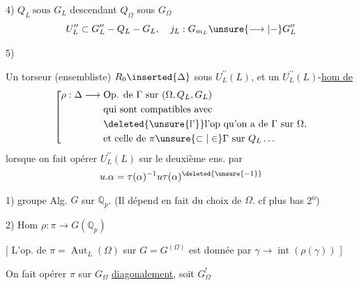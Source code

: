 4) \(\boxed{Q_L\ \text{sous }G_L}\) descendant $Q_\Omega$ sous $G_\Omega$
\[
U_L^{\prime\prime}\subset G_L^{\prime\prime}\mathbin{-}Q_L\mathbin{-}G_L,\quad
j_L:G_{m_L}\unsure{\longrightarrow|\mathbin{-}}G_L^{\prime\prime}
\]

5) 

Un torseur (ensembliste)  $R_0\inserted{\Delta}$ sous $U_L^{\prime\prime}(L)$, et un $U_L^{\prime\prime}(L)$-\uline{hom de}
\[
\left[\begin{aligned}
\rho:\Delta\longrightarrow{}&\text{Op. de }\Gamma\text{ sur }(\Omega,Q_L,G_L)\\
&\text{qui sont compatibles avec}\\
&\text{\deleted{\unsure{l’}}l’op qu’on a de }\Gamma\text{ sur }\Omega,\\
&\text{et celle de }\pi\unsure{\subset|\in}\Gamma\text{ sur }Q_L\ldots
\end{aligned}\right.
\]
lorsque on fait opérer $U_L^{\prime\prime}(L)$  sur le deuxième ens. par
\[
u.\alpha=\tau(\alpha)^{-1}u\tau(\alpha)^{\deleted{\unsure{-1}}}
\]
1) groupe Alg. $\boxed{G}$ sur $\mathbb Q_p$. (Il dépend en fait du choix de $\Omega$. cf plus bas 2\textsuperscript{o})

2) Hom \(\boxed{\rho:\pi\longrightarrow G(\mathbb Q_p)}\)

[ L’op. de $\pi=\operatorname{Aut}_L(\Omega)$ sur $G=G^{(\Omega)}$ est donnée par $\gamma\to\operatorname{int}(\rho(\gamma))$ ]

 On fait opérer $\pi$ sur $G_\Omega$ \uline{diagonalement}, soit $G_\Omega^{!}$


